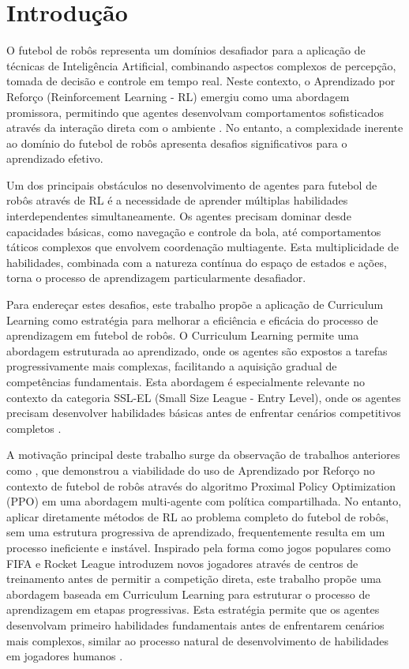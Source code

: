 
\chapter{Introdução}
\label{cap:intro}

O futebol de robôs representa um domínios desafiador para a aplicação de técnicas de Inteligência Artificial, combinando aspectos complexos de percepção, tomada de decisão e controle em tempo real. Neste contexto, o Aprendizado por Reforço (Reinforcement Learning - RL) emergiu como uma abordagem promissora, permitindo que agentes desenvolvam comportamentos sofisticados através da interação direta com o ambiente \cite{sutton}. No entanto, a complexidade inerente ao domínio do futebol de robôs apresenta desafios significativos para o aprendizado efetivo.

Um dos principais obstáculos no desenvolvimento de agentes para futebol de robôs através de RL é a necessidade de aprender múltiplas habilidades interdependentes simultaneamente. Os agentes precisam dominar desde capacidades básicas, como navegação e controle da bola, até comportamentos táticos complexos que envolvem coordenação multiagente. Esta multiplicidade de habilidades, combinada com a natureza contínua do espaço de estados e ações, torna o processo de aprendizagem particularmente desafiador.

Para endereçar estes desafios, este trabalho propõe a aplicação de Curriculum Learning como estratégia para melhorar a eficiência e eficácia do processo de aprendizagem em futebol de robôs. O Curriculum Learning permite uma abordagem estruturada ao aprendizado, onde os agentes são expostos a tarefas progressivamente mais complexas, facilitando a aquisição gradual de competências fundamentais. Esta abordagem é especialmente relevante no contexto da categoria SSL-EL (Small Size League - Entry Level), onde os agentes precisam desenvolver habilidades básicas antes de enfrentar cenários competitivos completos \cite{regras_ssl_el_2024}.

A motivação principal deste trabalho surge da observação de trabalhos anteriores como \cite{bruno_brandao}, que demonstrou a viabilidade do uso de Aprendizado por Reforço no contexto de futebol de robôs através do algoritmo Proximal Policy Optimization (PPO) em uma abordagem multi-agente com política compartilhada. No entanto, aplicar diretamente métodos de RL ao problema completo do futebol de robôs, sem uma estrutura progressiva de aprendizado, frequentemente resulta em um processo ineficiente e instável. Inspirado pela forma como jogos populares como FIFA e Rocket League introduzem novos jogadores através de centros de treinamento antes de permitir a competição direta, este trabalho propõe uma abordagem baseada em Curriculum Learning para estruturar o processo de aprendizagem em etapas progressivas. Esta estratégia permite que os agentes desenvolvam primeiro habilidades fundamentais antes de enfrentarem cenários mais complexos, similar ao processo natural de desenvolvimento de habilidades em jogadores humanos \cite{relay_long_horizon}.

